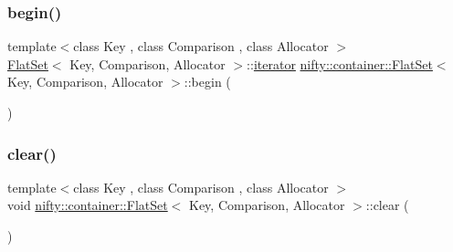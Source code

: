 \mbox{\label{classnifty_1_1container_1_1FlatSet_a2965a5b139947cf36bb90d594d3cb6c1}} 
\subsubsection{\texorpdfstring{begin()}{begin()}\hspace{0.1cm}{\footnotesize\ttfamily [2/2]}}
{\footnotesize\ttfamily template$<$class Key , class Comparison , class Allocator $>$ \\
\hyperlink{classnifty_1_1container_1_1FlatSet}{Flat\+Set}$<$ Key, Comparison, Allocator $>$\+::\hyperlink{classnifty_1_1container_1_1FlatSet_a9c7fd20cd6b1878ccb8a7e068072c795}{iterator} \hyperlink{classnifty_1_1container_1_1FlatSet}{nifty\+::container\+::\+Flat\+Set}$<$ Key, Comparison, Allocator $>$\+::begin (\begin{DoxyParamCaption}{ }\end{DoxyParamCaption})\hspace{0.3cm}{\ttfamily [inline]}}

\mbox{\label{classnifty_1_1container_1_1FlatSet_a8ff66c7635048e4e14dd70253fd1620b}} 
\subsubsection{\texorpdfstring{clear()}{clear()}}
{\footnotesize\ttfamily template$<$class Key , class Comparison , class Allocator $>$ \\
void \hyperlink{classnifty_1_1container_1_1FlatSet}{nifty\+::container\+::\+Flat\+Set}$<$ Key, Comparison, Allocator $>$\+::clear (\begin{DoxyParamCaption}{ }\end{DoxyParamCaption})\hspace{0.3cm}{\ttfamily [inline]}}

\mbox{\label{classnifty_1_1container_1_1FlatSet_ac7e6cc8196c095c0416ee27873ccc665}} 
